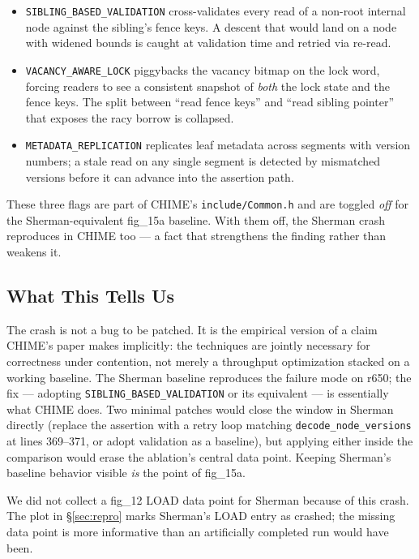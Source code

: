 \documentclass[11pt,a4paper]{article}
\begin{document}
\begin{itemize}[nosep]
    \item \texttt{SIBLING\_BASED\_VALIDATION} cross-validates every read of a non-root internal node against the sibling's fence keys. A descent that would land on a node with widened bounds is caught at validation time and retried via re-read.
    \item \texttt{VACANCY\_AWARE\_LOCK} piggybacks the vacancy bitmap on the lock word, forcing readers to see a consistent snapshot of \emph{both} the lock state and the fence keys. The split between ``read fence keys'' and ``read sibling pointer'' that exposes the racy borrow is collapsed.
    \item \texttt{METADATA\_REPLICATION} replicates leaf metadata across segments with version numbers; a stale read on any single segment is detected by mismatched versions before it can advance into the assertion path.
\end{itemize}

These three flags are part of CHIME's \texttt{include/Common.h} and are toggled \emph{off} for the Sherman-equivalent fig\_15a baseline. With them off, the Sherman crash reproduces in CHIME too --- a fact that strengthens the finding rather than weakens it.

\subsection{What This Tells Us}

The crash is not a bug to be patched. It is the empirical version of a claim CHIME's paper makes implicitly: the techniques are jointly necessary for correctness under contention, not merely a throughput optimization stacked on a working baseline. The Sherman baseline reproduces the failure mode on r650; the fix --- adopting \texttt{SIBLING\_BASED\_VALIDATION} or its equivalent --- is essentially what CHIME does. Two minimal patches would close the window in Sherman directly (replace the assertion with a retry loop matching \texttt{decode\_node\_versions} at lines 369--371, or adopt validation as a baseline), but applying either inside the comparison would erase the ablation's central data point. Keeping Sherman's baseline behavior visible \emph{is} the point of fig\_15a.

We did not collect a fig\_12 LOAD data point for Sherman because of this crash. The plot in §\ref{sec:repro} marks Sherman's LOAD entry as crashed; the missing data point is more informative than an artificially completed run would have been.
\end{document}
